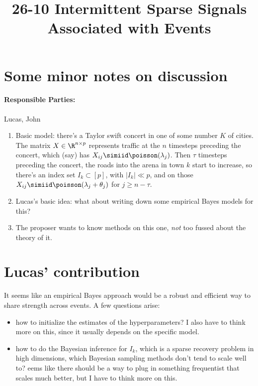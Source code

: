 \documentclass[11pt]{article}
\begin{document}
\title{26-10 Intermittent Sparse Signals Associated with Events}

\maketitle

\section{Some minor notes on discussion}

\paragraph{Responsible Parties:} Lucas, John

\begin{enumerate}[1.]
\item Basic model: there's a Taylor swift concert in one of some number
  $K$ of cities.
  The matrix $X \in \R^{n \times p}$ represents traffic at the $n$ timesteps
  preceding the concert, which (say) has $X_{ij} \simiid \poisson(\lambda_j)$.
  Then $\tau$ timesteps preceding the concert, the roads into the
  arena in town $k$ start to increase, so there's an index set
  $I_k \subset [p]$, with $|I_k| \ll p$, and on those
  $X_{ij} \simiid \poisson(\lambda_j + \theta_j)$ for $j \ge n - \tau$.
\item Lucas's basic idea: what about writing down some empirical Bayes
  models for this?
\item The proposer wants to know methods on this one, \emph{not} too fussed
  about the theory of it.
\end{enumerate}

\section{Lucas' contribution}
It seems like an empirical Bayes approach would be a robust and efficient way to share strength across events. A few questions arise:
\begin{itemize}
    \item how to initialize the estimates of the hyperparameters? I also have to think more on this, since it usually depends on the specific model.
    \item how to do the Bayesian inference for $I_k$, which is a sparse recovery problem in high dimensions, which Bayesian sampling methods don't tend to scale well to? eems like there should be a way to plug in something frequentist that scales much better, but I have to think more on this.
\end{itemize}
\end{document}
